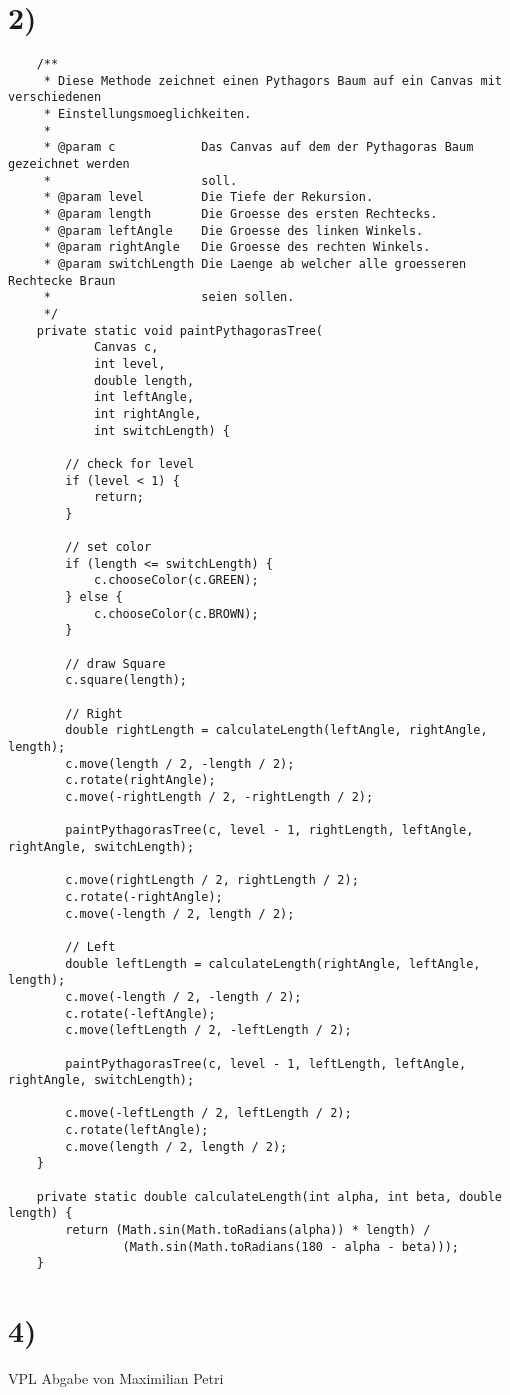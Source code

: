 \documentclass[12pt]{article}
\date{}
\begin{document}
\section{2)}
\begin{lstlisting}
    /**
     * Diese Methode zeichnet einen Pythagors Baum auf ein Canvas mit verschiedenen
     * Einstellungsmoeglichkeiten.
     * 
     * @param c            Das Canvas auf dem der Pythagoras Baum gezeichnet werden
     *                     soll.
     * @param level        Die Tiefe der Rekursion.
     * @param length       Die Groesse des ersten Rechtecks.
     * @param leftAngle    Die Groesse des linken Winkels.
     * @param rightAngle   Die Groesse des rechten Winkels.
     * @param switchLength Die Laenge ab welcher alle groesseren Rechtecke Braun 
     *                     seien sollen.
     */
    private static void paintPythagorasTree(
            Canvas c,
            int level,
            double length,
            int leftAngle,
            int rightAngle,
            int switchLength) {

        // check for level
        if (level < 1) {
            return;
        }

        // set color
        if (length <= switchLength) {
            c.chooseColor(c.GREEN);
        } else {
            c.chooseColor(c.BROWN);
        }

        // draw Square
        c.square(length);

        // Right
        double rightLength = calculateLength(leftAngle, rightAngle, length);
        c.move(length / 2, -length / 2);
        c.rotate(rightAngle);
        c.move(-rightLength / 2, -rightLength / 2);

        paintPythagorasTree(c, level - 1, rightLength, leftAngle, rightAngle, switchLength);

        c.move(rightLength / 2, rightLength / 2);
        c.rotate(-rightAngle);
        c.move(-length / 2, length / 2);

        // Left
        double leftLength = calculateLength(rightAngle, leftAngle, length);
        c.move(-length / 2, -length / 2);
        c.rotate(-leftAngle);
        c.move(leftLength / 2, -leftLength / 2);

        paintPythagorasTree(c, level - 1, leftLength, leftAngle, rightAngle, switchLength);

        c.move(-leftLength / 2, leftLength / 2);
        c.rotate(leftAngle);
        c.move(length / 2, length / 2);
    }

    private static double calculateLength(int alpha, int beta, double length) {
        return (Math.sin(Math.toRadians(alpha)) * length) / 
                (Math.sin(Math.toRadians(180 - alpha - beta)));
    }
\end{lstlisting}

\section{4)}
\begin{center}
    VPL Abgabe von Maximilian Petri
\end{center}
\end{document}
